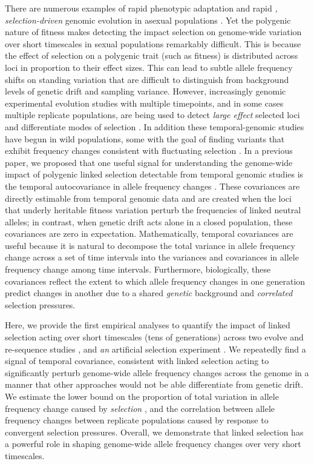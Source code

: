 \documentclass[11pt]{article}
\newcommand{\gc}[1]{{\it \color{red} #1 } }
\begin{document}
There are numerous examples of rapid phenotypic adaptation
\parencite{Grant2011-wk,Grant2006-hj,Reznick1997-mh,Franks2007-dr} and rapid
\gc{, selection-driven} genomic evolution in asexual populations
\parencite{Good2017-om,Bennett1990-bc,Baym2016-kh}.  Yet the polygenic nature
of fitness makes detecting the impact selection on genome-wide variation over
short timescales in sexual populations remarkably difficult. This is because
the effect of selection on a polygenic trait (such as fitness) is distributed
across loci in proportion to their effect sizes. This can lead to subtle allele
frequency shifts on standing variation that are difficult to distinguish from
background levels of genetic drift and sampling variance.  However,
increasingly genomic experimental evolution studies with multiple timepoints,
and in some cases multiple replicate populations, are being used to detect
\gc{large effect} selected loci \parencite{Turner2011-sx,Turner2012-bm} and differentiate modes
of selection \parencite{Burke2010-tz,Barghi2019-qy,Therkildsen2019-zy}.  In
addition these temporal-genomic studies have begun in wild populations, some
with the goal of finding variants that exhibit frequency changes consistent
with fluctuating selection \parencite{Bergland2014-ij,Machado2018-cs}. In a
previous paper, we proposed that one useful signal for understanding the
genome-wide impact of polygenic linked selection detectable from temporal
genomic studies is the temporal autocovariance in allele frequency changes
\parencite{Buffalo2019-io}.  These covariances are directly estimable from
temporal genomic data and are created when the loci that underly heritable
fitness variation perturb the frequencies of linked neutral alleles; in
contrast, when genetic drift acts alone in a closed population, these
covariances are zero in expectation. Mathematically, temporal covariances are
useful because it is natural to decompose the total variance in allele
frequency change across a set of time intervals into the variances and
covariances in allele frequency change among time intervals. Furthermore,
biologically, these covariances reflect the extent to which allele frequency
changes in one generation predict changes in another due to a shared \gc{genetic} %
background and \gc{correlated} selection pressures. %

Here, we provide the first empirical analyses to quantify the impact of linked
selection acting over short timescales (tens of generations) across two evolve
and re-sequence studies \parencite{Barghi2019-qy,Kelly2019-dc}, and \gc{an}
artificial selection experiment \parencite{Castro2019-uk}. We repeatedly find a
signal of temporal covariance, consistent with linked selection acting to
significantly perturb genome-wide allele frequency changes across the genome in
a manner that other approaches would not be able differentiate from genetic
drift. We estimate the lower bound on the proportion of total variation in
allele frequency change caused by \gc{selection}, and the correlation
between  %
allele frequency changes between replicate populations caused by response to
convergent selection pressures. Overall, we demonstrate that linked selection
has a powerful role in shaping genome-wide allele frequency changes over very
short timescales.
\end{document}
